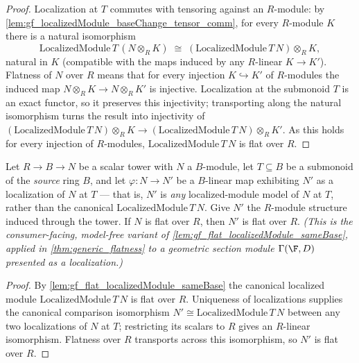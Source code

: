 \begin{proof}
  \leanok
  Localization at \(T\) commutes with tensoring against an \(R\)-module: by
  \cref{lem:gf_localizedModule_baseChange_tensor_comm}, for every \(R\)-module \(K\)
  there is a natural isomorphism
  \[
    \mathrm{LocalizedModule}\,T\,(N \otimes_R K)
      \;\cong\; (\mathrm{LocalizedModule}\,T\,N) \otimes_R K,
  \]
  natural in \(K\) (compatible with the maps induced by any \(R\)-linear \(K \to K'\)).
  Flatness of \(N\) over \(R\) means that for every injection \(K \hookrightarrow K'\) of
  \(R\)-modules the induced map \(N \otimes_R K \to N \otimes_R K'\) is injective.
  Localization at the submonoid \(T\) is an exact functor, so it preserves this
  injectivity; transporting along the natural isomorphism turns the result into
  injectivity of
  \((\mathrm{LocalizedModule}\,T\,N) \otimes_R K \to (\mathrm{LocalizedModule}\,T\,N) \otimes_R K'\).
  As this holds for every injection of \(R\)-modules, \(\mathrm{LocalizedModule}\,T\,N\)
  is flat over \(R\).
\end{proof}

\begin{lemma}

  \label{lem:gf_flat_isLocalizedModule_sameBase}
  Let \(R \to B \to N\) be a scalar tower with \(N\) a \(B\)-module, let \(T \subseteq B\) be a
  submonoid of the \emph{source} ring \(B\), and let \(\varphi : N \to N'\) be a \(B\)-linear map
  exhibiting \(N'\) as a localization of \(N\) at \(T\) — that is, \(N'\) is \emph{any}
  localized-module model of \(N\) at \(T\), rather than the canonical
  \(\mathrm{LocalizedModule}\,T\,N\). Give \(N'\) the \(R\)-module structure induced through the
  tower. If \(N\) is flat over \(R\), then \(N'\) is flat over \(R\). \emph{(This is the
  consumer-facing, model-free variant of \cref{lem:gf_flat_localizedModule_sameBase}, applied in
  \cref{thm:generic_flatness} to a geometric section module \(\Gamma(\F, D)\) presented as a
  localization.)}
\end{lemma}

\begin{proof}
  \leanok
  By \cref{lem:gf_flat_localizedModule_sameBase} the canonical localized module
  \(\mathrm{LocalizedModule}\,T\,N\) is flat over \(R\). Uniqueness of localizations supplies the
  canonical comparison isomorphism \(N' \cong \mathrm{LocalizedModule}\,T\,N\) between any two
  localizations of \(N\) at \(T\); restricting its scalars to \(R\) gives an \(R\)-linear
  isomorphism. Flatness over \(R\) transports across this isomorphism, so \(N'\) is flat over
  \(R\).
\end{proof}

